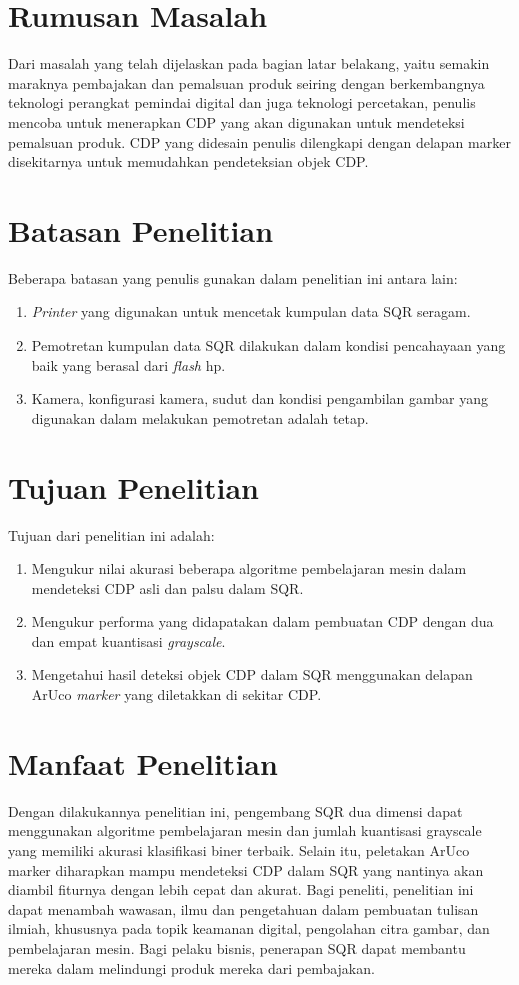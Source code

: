 \section{Rumusan Masalah}
Dari masalah yang telah dijelaskan pada bagian latar belakang, yaitu semakin maraknya pembajakan dan pemalsuan produk seiring dengan berkembangnya teknologi perangkat pemindai digital dan juga teknologi percetakan, penulis mencoba untuk menerapkan CDP yang akan digunakan untuk mendeteksi pemalsuan produk. CDP yang didesain penulis dilengkapi dengan delapan marker disekitarnya untuk memudahkan pendeteksian objek CDP.


\section{Batasan Penelitian}
Beberapa batasan yang penulis gunakan dalam penelitian ini antara lain:
\begin{enumerate}
    \item \textit{Printer} yang digunakan untuk mencetak kumpulan data SQR seragam.
    \item Pemotretan kumpulan data SQR dilakukan dalam kondisi pencahayaan yang baik yang berasal dari \emph{flash} hp.
    \item Kamera, konfigurasi kamera, sudut dan kondisi pengambilan gambar yang digunakan dalam melakukan pemotretan adalah tetap.
\end{enumerate}


\section{Tujuan Penelitian}Tujuan dari penelitian ini adalah:
\begin{enumerate}
    \item Mengukur nilai akurasi beberapa algoritme pembelajaran mesin dalam mendeteksi CDP asli dan palsu dalam SQR.
    \item Mengukur performa yang didapatakan dalam pembuatan CDP dengan dua dan empat kuantisasi \textit{grayscale}.
    \item Mengetahui hasil deteksi objek CDP dalam SQR menggunakan delapan ArUco \textit{marker} yang diletakkan di sekitar CDP.
\end{enumerate}


\section{Manfaat Penelitian}
Dengan dilakukannya penelitian ini, pengembang SQR dua dimensi dapat menggunakan algoritme pembelajaran mesin dan jumlah kuantisasi grayscale yang memiliki akurasi klasifikasi biner terbaik. Selain itu, peletakan ArUco marker diharapkan mampu mendeteksi CDP dalam SQR yang nantinya akan diambil fiturnya dengan lebih cepat dan akurat. Bagi peneliti, penelitian ini dapat menambah wawasan, ilmu dan pengetahuan dalam pembuatan tulisan ilmiah, khususnya pada topik keamanan digital, pengolahan citra gambar, dan pembelajaran mesin. Bagi pelaku bisnis, penerapan SQR dapat membantu mereka dalam melindungi produk mereka dari pembajakan.


